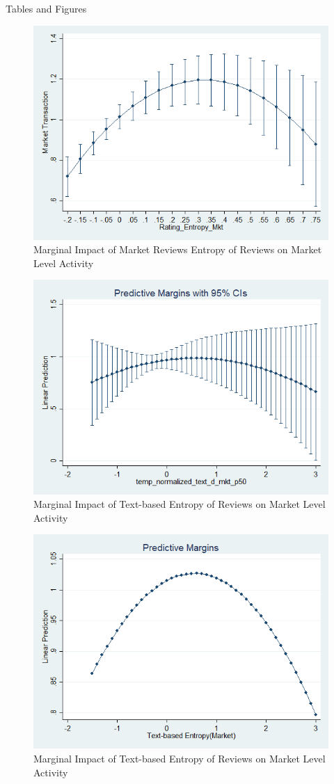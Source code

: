 \documentclass[msom,blindrev]{informs3}
\begin{document}
\begin{APPENDIX}{Tables and Figures}
\begin{figure}
	\centering
	\includegraphics[width=0.7\linewidth]{marginsplot_entmkt.png}
	\caption{Marginal Impact of Market Reviews Entropy of Reviews on Market Level Activity}
\end{figure}  
\begin{figure}
	\centering
	\includegraphics[width=0.7\linewidth]{marginsplot_text_ent_mkt.png}
	\caption{Marginal Impact of Text-based Entropy of Reviews on Market Level Activity}
\end{figure}  
\begin{figure}
	\centering
	\includegraphics[width=0.7\linewidth]{marginsplot_text_ent_mkt_noci.png}
	\caption{Marginal Impact of Text-based Entropy of Reviews on Market Level Activity}
\end{figure}  
\end{APPENDIX}
\end{document}
